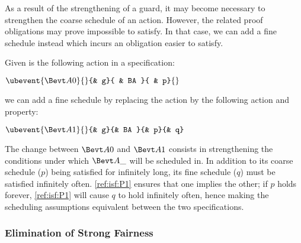 As a result of the strengthening of a guard, it may become necessary to strengthen the coarse schedule of an action.  However, the related proof obligations may prove impossible to satisfy.  In that case, we can add a fine schedule instead which incurs an obligation easier to satisfy.

Given is the following action in a specification:

\begin{Bcode}
  $
  \ubevent{\AAA0}{}{& g}{ & BA }{ & p}{}
  $
\end{Bcode}

we can add a fine schedule by replacing the action by the following action and property: 

\begin{minipage}{0.48\textwidth}
\begin{Bcode}
  $
  \ubevent{\AAA1}{}{& g}{& BA }{& p}{& q}
  $
\end{Bcode}
\end{minipage}
\begin{minipage}{0.48\textwidth}
\begin{Bcode}
\end{Bcode}
\end{minipage}

The change between $\AAA0$ and $\AAA1$ consists in strengthening the conditions under which $\AAA\_$ will be scheduled in.  In addition to its coarse schedule ($p$) being satisfied for infinitely long, its fine schedule ($q$) must be satisfied infinitely often.  \eqref{ref:isf:P1} ensures that one implies the other; if $p$ holds forever, \eqref{ref:isf:P1} will cause $q$ to hold infinitely often, hence making the scheduling assumptions equivalent between the two specifications.

\subsubsection{Elimination of Strong Fairness}

